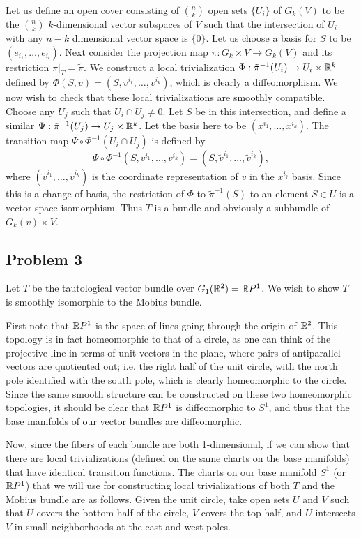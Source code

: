\documentclass{../../mathnotes}
\begin{document}
Let us define an open cover consisting of $\binom{n}{k}$ open sets $\{U_i\}$ of $G_k(V)$ to be the $\binom{n}{k}$ $k$-dimensional vector subspaces of $V$
such that the intersection of $U_i$ with any $n-k$ dimensional vector space is $\{0\}$. Let us choose a basis for $S$ to be $(e_{i_1}, \dots, e_{i_l})$.
Next consider the projection map $\pi : G_k \times V \to G_k(V)$ and its restriction $\pi|_T = \tilde{\pi}$.
We construct a local trivialization $\Phi : \tilde{\pi}^{-1}(U_i) \to U_i \times \mathbb{R}^k$ defined by $\Phi(S,v) = (S, v^{i_1}, \dots, v^{i_k})$, which
is clearly a diffeomorphism.
We now wish to check that these local trivializations are smoothly compatible. Choose any $U_j$ such that $U_i \cap U_j \neq 0$. Let $S$ be in this intersection, and define a similar $\Psi : \tilde{\pi}^{-1}(U_j) \to U_j \times \mathbb{R}^k$.
Let the basis here to be $(x^{i_1}, \dots, x^{i_k})$. The transition map $\Psi \circ \Phi^{-1}(U_i \cap U_j)$ is defined by
\[ \Psi \circ \Phi^{-1}(S, v^{i_1}, \dots, v^{i_k}) = (S, \tilde{v}^{i_1}, \dots, \tilde{v}^{i_k}), \] where $(\tilde{v}^{i_1}, \dots, \tilde{v}^{i_k})$
is the coordinate representation of $v$ in the $x^{i_j}$ basis.
Since this is a change of basis, the restriction of $\Phi$ to $\tilde{\pi}^{-1}(S)$ to an element $S \in U$ is a vector space isomorphism.
Thus $T$ is a bundle and obviously a subbundle of $G_k(v) \times V$. 

\subsection*{Problem 3}

Let $T$ be the tautological vector bundle over $G_1(\mathbb{R}^2)=\mathbb{R} P^1$. We wish to show $T$ is smoothly isomorphic
to the Mobius bundle.

First note that $\mathbb{R} P^1$ is the space of lines going through the origin of $\mathbb{R}^2$. This topology
is in fact homeomorphic to that of a circle, as one can think of the projective line in terms of unit vectors in the plane, where
pairs of antiparallel vectors are quotiented out; i.e. the right half of the unit circle, with the north pole identified with the south
pole, which is clearly homeomorphic to the circle. Since the same smooth structure can be constructed on these two homeomorphic topologies,
it should be clear that $\mathbb{R} P^1$ is diffeomorphic to $S^1$, and thus that the base manifolds of our vector bundles are diffeomorphic.

Now, since the fibers of each bundle are both 1-dimensional, if we can show that there are local trivializations
(defined on the same charts on the base manifolds) that have identical transition functions. The charts on our base manifold $S^1$
(or $\mathbb{R} P^1$) that we will use for constructing local trivializations of both $T$ and the Mobius bundle are as follows. Given
the unit circle, take open sets $U$ and $V$ such that $U$ covers the bottom half of the circle, $V$ covers the top half, and $U$
intersects $V$ in small neighborhoods at the east and west poles.
\end{document}
